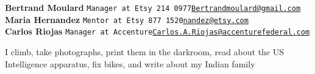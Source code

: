 \documentclass[9pt]{developercv} %
\begin{document}
    
    \large\textbf{Bertrand Moulard} \slashsep \large\texttt{Manager at Etsy 214 0977\slashsep\href{mailto:Bertrandmoulard@gmail.com}{Bertrandmoulard@gmail.com}}\\
    \large\textbf{Maria Hernandez} \slashsep \large\texttt{Mentor at Etsy 877 1520\slashsep\href{mailto:nandez@etsy.com}{nandez@etsy.com}}\\
    \large\textbf{Carlos Riojas} \slashsep \large\texttt{Manager at Accenture\slashsep\href{mailto:Carlos.A.Riojas@accenturefederal.com}{Carlos.A.Riojas@accenturefederal.com}}

\begin{minipage}[t]{0.45\textwidth}
    \vspace{-\baselineskip} %
    
    
    I climb, take photographs, print them in the darkroom, read about the US Intelligence apparatus, fix bikes, and write about my Indian family
\end{minipage}
\hfill
\begin{minipage}[t]{0.45\textwidth}
    \vspace{-\baselineskip} %
\end{minipage}

\end{document}
